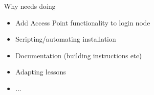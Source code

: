 \documentclass[11pt]{beamer}
\begin{document}
\begin{frame}{Why needs doing}
	\begin{itemize}
		\item Add Access Point functionality to login node
		\item Scripting/automating installation
		\item Documentation (building instructions etc)
		\item Adapting lessons
		\item ...
	\end{itemize}
\end{frame}
\end{document}
